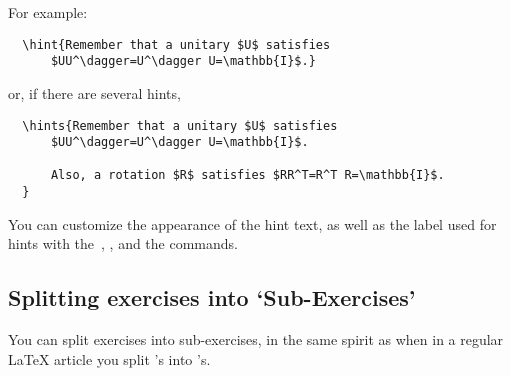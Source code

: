 \documentclass[11pt,a4paper]{article}
\begin{document}
For example:
\begin{pkgverbatim}
\begin{verbatim}
  \hint{Remember that a unitary $U$ satisfies
      $UU^\dagger=U^\dagger U=\mathbb{I}$.}
\end{verbatim}
\end{pkgverbatim}
or, if there are several hints,
\begin{pkgverbatim}
\begin{verbatim}
  \hints{Remember that a unitary $U$ satisfies
      $UU^\dagger=U^\dagger U=\mathbb{I}$.

      Also, a rotation $R$ satisfies $RR^T=R^T R=\mathbb{I}$.
  }
\end{verbatim}
\end{pkgverbatim}

\begin{pkgtip}
  You can customize the appearance of the hint text, as well as the label used for hints
  with the~, , and the
   commands.
\end{pkgtip}

\subsection{Splitting exercises into `Sub-Exercises'}
\label{sec:subexercises}

You can split exercises into sub-exercises, in the same spirit as when in a regular
\LaTeX{} article you split 's into 's.


\end{document}
